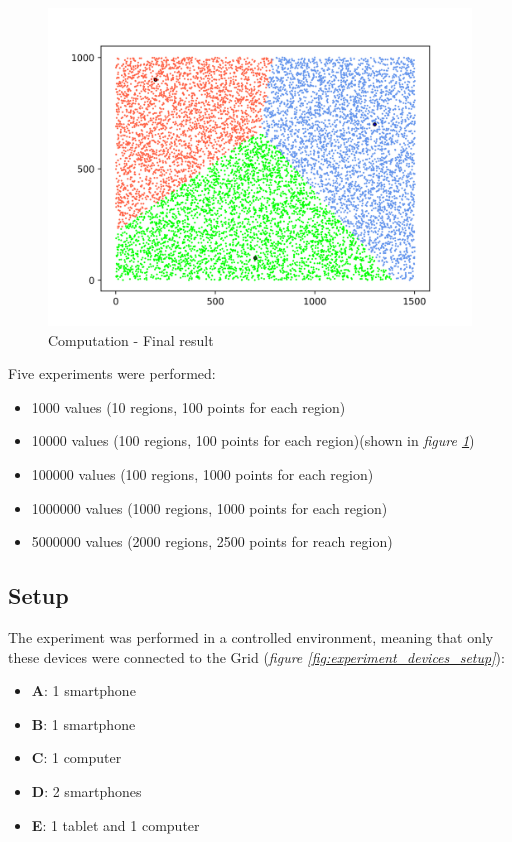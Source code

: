 \begin{figure}[!ht]
    \centering
    \includegraphics[width=\linewidth]{document/chapters/chapter_7/images/computation_final_result.png}
    \caption{Computation - Final result}
    \label{fig:computation_final_result}
\end{figure}

Five experiments were performed:
\begin{itemize}
    \item 1000 values (10 regions, 100 points for each region)
    \item 10000 values (100 regions, 100 points for each region)(shown in \textit{figure \ref{fig:computation_final_result}})
    \item 100000 values (100 regions, 1000 points for each region)
    \item 1000000 values (1000 regions, 1000 points for each region)
    \item 5000000 values (2000 regions, 2500 points for reach region)
\end{itemize}

\subsection{Setup}
The experiment was performed in a controlled environment, meaning that only these devices were connected to the Grid (\textit{figure \ref{fig:experiment_devices_setup}}):
\begin{itemize}
    \item \textbf{A}: 1 smartphone
    \item \textbf{B}: 1 smartphone
    \item \textbf{C}: 1 computer
    \item \textbf{D}: 2 smartphones
    \item \textbf{E}: 1 tablet and 1 computer
\end{itemize}

